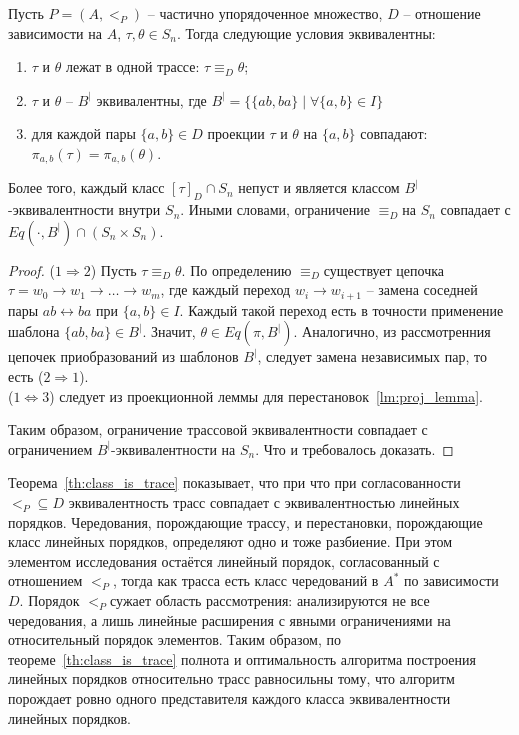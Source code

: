 \begin{theorem}
  Пусть $P = (A, <_P)$ -- частично упорядоченное множество, $D$
  -- отношение зависимости на $A$, $\tau, \theta \in S_n$. Тогда
  следующие условия эквивалентны:
  \begin{enumerate}
    \item $\tau$ и $\theta$ лежат в одной трассе: $\tau \equiv_D \theta$;
    \item $\tau$ и $\theta$ -- $B^|$ эквивалентны, где $B^| =
      \{\{ab, ba\} \mid \forall \{a, b\} \in I \}$
    \item для каждой пары $\{a, b\} \in D$ проекции $\tau$ и
      $\theta$ на $\{a, b\}$ совпадают: $\pi_{a, b}(\tau) = \pi_{a,
      b}(\theta)$.
  \end{enumerate}

  Более того, каждый класс $[\tau]_D \cap S_n$ непуст и
  является классом $B^|$-эквивалентности внутри $S_n$. Иными
  словами, ограничение $\equiv_D$​ на $S_n$ совпадает с
  $Eq(\cdot, B^|) \cap (S_n \times S_n)$.
  \label{th:class_is_trace}
\end{theorem}

\begin{proof}
  \hfill\break
  ($1 \Rightarrow 2$)
  Пусть $\tau \equiv_D \theta$.
  По определению $\equiv_D$​ существует цепочка $\tau = w_0
  \rightarrow w_1 \rightarrow \dots \rightarrow w_m$,
  где каждый переход $w_i \rightarrow w_{i+1}$ -- замена соседней
  пары $ab \leftrightarrow ba$ при $\{a,b\} \in I$.
  Каждый такой переход есть в точности применение шаблона
  $\{ab,ba\} \in B^|$.
  Значит, $\theta \in Eq(\pi, B^|)$.
  Аналогично, из рассмотренния цепочек приобразований из шаблонов
  $B^|$, следует замена независимых пар, то есть
  ($2 \Rightarrow 1$).\\
  ($1 \Leftrightarrow 3$) следует из проекционной леммы для
  перестановок~\ref{lm:proj_lemma}.

  Таким образом, ограничение трассовой эквивалентности совпадает с
  ограничением $B^∣$-эквивалентности на $S_n$.
  Что и требовалось доказать.
\end{proof}

Теорема~\ref{th:class_is_trace} показывает, что при что при
согласованности $<_P \subseteq D$ эквивалентность трасс совпадает с
эквивалентностью линейных порядков. Чередования, порождающие
трассу, и перестановки, порождающие класс линейных порядков,
определяют одно и тоже разбиение.
При этом элементом исследования остаётся линейный порядок,
согласованный с отношением $<_P$, тогда как трасса есть класс
чередований в $A^*$ по зависимости $D$. Порядок $<_P$​ сужает
область рассмотрения: анализируются не все чередования, а лишь
линейные расширения с явными ограничениями на относительный
порядок элементов.
Таким образом, по теореме~\ref{th:class_is_trace} полнота и
оптимальность алгоритма построения линейных порядков относительно
трасс равносильны тому, что алгоритм порождает ровно одного
представителя каждого класса эквивалентности линейных порядков.

